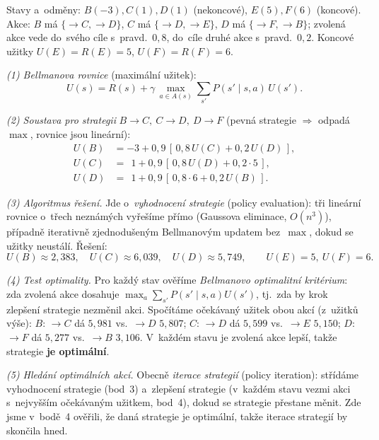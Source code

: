 \noindent Stavy a~odměny: $B(-3),C(1),D(1)$ (nekoncové), $E(5),F(6)$ (koncové). Akce: $B$ má $\{\to C,\to D\}$, $C$ má $\{\to D,\to E\}$, $D$ má $\{\to F,\to B\}$; zvolená akce vede do~svého cíle s~pravd.\ $0{,}8$, do~cíle druhé akce s~pravd.\ $0{,}2$. Koncové užitky $U(E)=R(E)=5$, $U(F)=R(F)=6$.

\noindent\emph{(1) Bellmanova rovnice} (maximální užitek):
\[ U(s)=R(s)+\gamma\,\max_{a\in A(s)}\sum_{s'} P(s'\mid s,a)\,U(s'). \]

\noindent\emph{(2) Soustava pro strategii} $B\to C,\ C\to D,\ D\to F$ (pevná strategie $\Rightarrow$ odpadá $\max$, rovnice jsou lineární):
\[
\begin{aligned}
U(B)&=-3+0{,}9\,[\,0{,}8\,U(C)+0{,}2\,U(D)\,],\\
U(C)&=\ \ 1+0{,}9\,[\,0{,}8\,U(D)+0{,}2\cdot5\,],\\
U(D)&=\ \ 1+0{,}9\,[\,0{,}8\cdot6+0{,}2\,U(B)\,].
\end{aligned}
\]

\noindent\emph{(3) Algoritmus řešení.} Jde o~\emph{vyhodnocení strategie} (policy evaluation): tři lineární rovnice o~třech neznámých vyřešíme přímo (Gaussova eliminace, $O(n^3)$), případně iterativně zjednodušeným Bellmanovým updatem bez~$\max$, dokud se užitky neustálí. Řešení:
\[ \boxed{U(B)\approx 2{,}383,\quad U(C)\approx 6{,}039,\quad U(D)\approx 5{,}749},\qquad U(E)=5,\ U(F)=6. \]

\noindent\emph{(4) Test optimality.} Pro každý stav ověříme \emph{Bellmanovo optimalitní kritérium}: zda zvolená akce dosahuje $\max_a \sum_{s'} P(s'\mid s,a)U(s')$, tj.\ zda by krok zlepšení strategie nezměnil akci. Spočítáme očekávaný užitek obou akcí (z~užitků výše): $B$: $\to C$ dá $5{,}981$ vs.\ $\to D$ $5{,}807$; $C$: $\to D$ dá $5{,}599$ vs.\ $\to E$ $5{,}150$; $D$: $\to F$ dá $5{,}277$ vs.\ $\to B$ $3{,}106$. V~každém stavu je zvolená akce lepší, takže strategie \textbf{je optimální}.

\noindent\emph{(5) Hledání optimálních akcí.} Obecně \emph{iterace strategií} (policy iteration): střídáme vyhodnocení strategie (bod~3) a~zlepšení strategie (v~každém stavu vezmi akci s~nejvyšším očekávaným užitkem, bod~4), dokud se strategie přestane měnit. Zde jsme v~bodě~4 ověřili, že daná strategie je optimální, takže iterace strategií by skončila hned.
